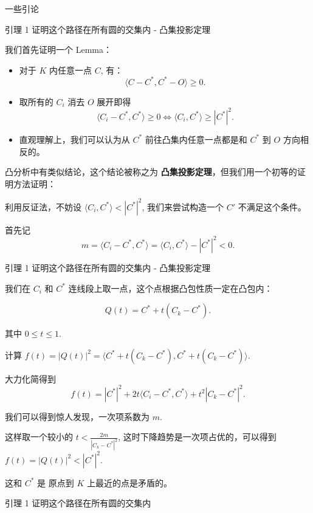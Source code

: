 \documentclass{beamer}
\begin{document}
{\begin{frame}{一些引论}
\end{frame}


\begin{frame}{引理 1  证明这个路径在所有圆的交集内 - 凸集投影定理}

我们首先证明一个 Lemma：

\begin{itemize}
  \item 对于 $K$ 内任意一点 $C$, 有：
  \[
     \langle C - C^\ast, C^\ast - O \rangle \ge 0.
  \]
  \item 取所有的 $C_i$ 消去 $O$ 展开即得 \[
    \langle C_i - C^\ast, C^\ast\rangle \ge 0  \Leftrightarrow  \langle C_i, C^\ast \rangle \ge |C^\ast|^2.
  \]
  \item 直观理解上，我们可以认为从 $C^\ast$ 前往凸集内任意一点都是和 $C^\ast$ 到 $O$ 方向相反的。
\end{itemize}

凸分析中有类似结论，这个结论被称之为 \textbf{凸集投影定理}，但我们用一个初等的证明方法证明：

利用反证法，不妨设 $\langle C_i, C^\ast \rangle < |C^\ast|^2$, 我们来尝试构造一个 $C'$ 不满足这个条件。

首先记 \[
  m = \langle C_i - C^\ast, C^\ast \rangle = \langle C_i, C^\ast \rangle - |C^\ast|^2 < 0.
\]

\end{frame}


\begin{frame}{引理 1 证明这个路径在所有圆的交集内 - 凸集投影定理}

我们在 $C_i$ 和 $C^\ast$ 连线段上取一点，这个点根据凸包性质一定在凸包内：

\[
  Q(t) = C^\ast + t(C_k - C^\ast).
\]

其中 $0 \le t \le 1$.

计算 $f(t) = |Q(t)|^2 = \langle C^\ast + t(C_k - C^\ast), C^\ast + t(C_k - C^\ast) \rangle$.

大力化简得到
\[
  f(t) = |C^\ast|^2 + 2t\langle C_i - C^\ast, C^\ast \rangle + t^2 |C_k - C^\ast|^2.
\]

我们可以得到惊人发现，一次项系数为 $m$.

这样取一个较小的 $t < \frac{2m}{|C_k - C^\ast|^2}$, 这时下降趋势是一次项占优的，可以得到 $f(t) = |Q(t)|^2 < |C^\ast|^2$.

这和 $C^\ast$ 是 原点到 $K$ 上最近的点是矛盾的。

\end{frame}


\begin{frame}{引理 1 证明这个路径在所有圆的交集内}


\end{frame}}
\end{document}
